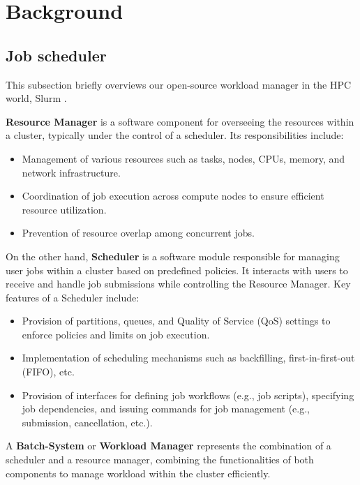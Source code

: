\chapter{Background}
\section{Job scheduler}
This subsection briefly overviews our open-source workload manager in the HPC world, Slurm \cite{10.1007/10968987_3}.

\textbf{Resource Manager} is a software component for overseeing the resources within a cluster, typically under the control of a scheduler. Its responsibilities include:

\begin{itemize}
    \item Management of various resources such as tasks, nodes, CPUs, memory, and network infrastructure.
    \item Coordination of job execution across compute nodes to ensure efficient resource utilization.
    \item Prevention of resource overlap among concurrent jobs.
\end{itemize}

On the other hand, \textbf{Scheduler} is a software module responsible for managing user jobs within a cluster based on predefined policies. It interacts with users to receive and handle job submissions while controlling the Resource Manager. Key features of a Scheduler include:

\begin{itemize}
    \item Provision of partitions, queues, and Quality of Service (QoS) settings to enforce policies and limits on job execution.
    \item Implementation of scheduling mechanisms such as backfilling, first-in-first-out (FIFO), etc.
    \item Provision of interfaces for defining job workflows (e.g., job scripts), specifying job dependencies, and issuing commands for job management (e.g., submission, cancellation, etc.).
\end{itemize}

A \textbf{Batch-System} or \textbf{Workload Manager} represents the combination of a scheduler and a resource manager, combining the functionalities of both components to manage workload within the cluster efficiently.


